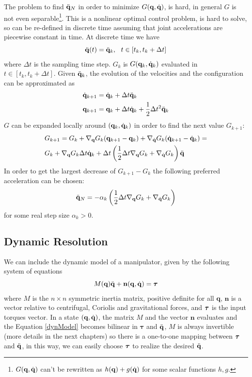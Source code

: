\documentclass[10pt, a4paper]{report}
\newcommand{\q}{{\mathbf q}}
\begin{document}
The problem to find ${\ddot{\mathbf q}}_N$ in order to minimize $G(\mathbf q, {\dot{\mathbf q}})$, is hard, in general $G$ is not even separable\footnote{$G(\mathbf q, {\dot{\mathbf q}})$ can't be rewritten as $h(\mathbf q)+g({\dot{\mathbf q}})$ for some scalar functions $h,g$.}. This is a nonlinear optimal control problem, is hard to solve, so can be re-defined in discrete time assuming that joint accelerations are piecewise constant in time. At discrete time we have \begin{equation}
    \ddq(t)=\ddq_k, \ \ t\in[t_k,t_k+\Delta t]
\end{equation}
where $\Delta t$ is the sampling time step. $G_k$ is $G(\mathbf q_k,{\dot{\mathbf q}}_k)$ evaluated in $t\in[t_k,t_k+\Delta t]$. Given ${\ddot{\mathbf q}}_k$, the evolution of the velocities and the configuration can be approximated as\begin{align}
    &{\dot{\mathbf q}}_{k+1}={\dot{\mathbf q}}_k+\Delta t{\ddot{\mathbf q}}_k\\
    &\mathbf q_{k+1}=\mathbf q_k+\Delta t{\dot{\mathbf q}}_k+\frac{1}{2}\Delta t^2{\ddot{\mathbf q}}_k
\end{align}
$G$ can be expanded locally around $(\mathbf q_k,{\dot{\mathbf q}}_k)$ in order to find the next value $G_{k+1}$:\begin{align}
    &G_{k+1}=G_k+\nabla_{\mathbf q}G_k(\mathbf q_{k+1}-\mathbf q_k)+
    \nabla_{{\dot{\mathbf q}}}G_k({\dot{\mathbf q}}_{k+1}-{\dot{\mathbf q}}_k)=\\ 
    &G_k+\nabla_{\mathbf q}G_k\Delta t{\dot{\mathbf q}}_k+\Delta t\left(\frac{1}{2}\Delta t \nabla_{\mathbf q}G_k+\nabla_{{\dot{\mathbf q}}}G_k\right){\ddot{\mathbf q}}
\end{align}
In order to get the largest decrease of $G_{k+1}-G_k$ the following preferred acceleration can be chosen:\begin{equation}
    {\ddot{\mathbf q}}_N=-\alpha_k\left(\frac{1}{2}\Delta t \nabla_{\mathbf q}G_k+\nabla_{{\dot{\mathbf q}}}G_k\right)
\end{equation}
for some real step size $\alpha_k>0$.
\subsection{Dynamic Resolution}
We can include the dynamic model of a manipulator, given by the following system of equations\begin{equation}\label{dynModel}
    M(\q)\ddq+\mathbf n(\q,\dq)=\btau
\end{equation}
where $M$ is the $n\times n$ symmetric inertia matrix, positive definite for all $\q$, $\mathbf n$ is a vector relative to centrifugal, Coriolis and gravitational forces, and ${\boldsymbol{\tau}}$ is the input torques vector. In a state $(\q,\dq)$, the matrix $M$ and the vector $\mathbf n$ evaluates and the Equation \eqref{dynModel} becomes bilinear in $\boldsymbol\tau$ and ${\ddot{\mathbf q}}$, $M$ is always invertible (more details in the next chapters) so there is a one-to-one mapping between ${\boldsymbol{\tau}}$ and ${\ddot{\mathbf q}}$, in this way, we can easily choose ${\boldsymbol{\tau}}$ to realize the desired ${\ddot{\mathbf q}}$.\bigskip
\end{document}
